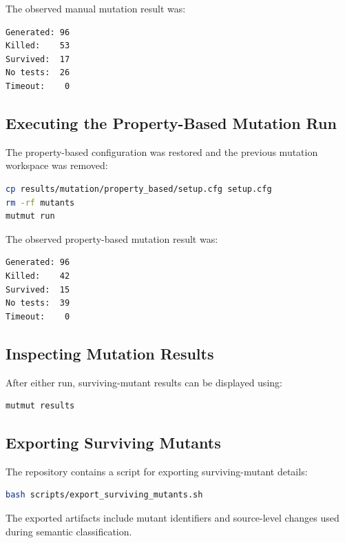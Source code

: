 \documentclass[12pt]{article}
\begin{document}
The observed manual mutation result was:

\begin{verbatim}
Generated: 96
Killed:    53
Survived:  17
No tests:  26
Timeout:    0
\end{verbatim}

\subsection{Executing the Property-Based Mutation Run}

The property-based configuration was restored and the previous mutation
workspace was removed:

\begin{lstlisting}[language=bash,caption={Executing the property-based mutation run}]
cp results/mutation/property_based/setup.cfg setup.cfg
rm -rf mutants
mutmut run
\end{lstlisting}

The observed property-based mutation result was:

\begin{verbatim}
Generated: 96
Killed:    42
Survived:  15
No tests:  39
Timeout:    0
\end{verbatim}

\subsection{Inspecting Mutation Results}

After either run, surviving-mutant results can be displayed using:

\begin{lstlisting}[language=bash,caption={Displaying mutation results}]
mutmut results
\end{lstlisting}
\subsection{Exporting Surviving Mutants}

The repository contains a script for exporting surviving-mutant details:

\begin{lstlisting}[language=bash,caption={Exporting surviving-mutant details}]
bash scripts/export_surviving_mutants.sh
\end{lstlisting}

The exported artifacts include mutant identifiers and source-level changes used
during semantic classification.
\end{document}

